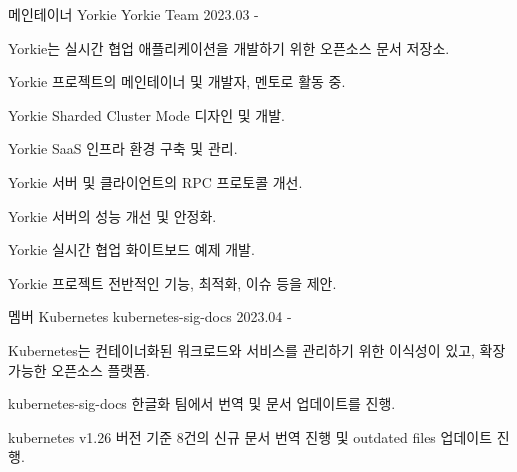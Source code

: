 

\begin{cventries}

  \cventry
    {메인테이너} %
    {Yorkie} %
    {Yorkie Team} %
    {2023.03 - } %
    {
      \begin{cvitems} %
        \item {Yorkie는 실시간 협업 애플리케이션을 개발하기 위한 오픈소스 문서 저장소.}
        \item {Yorkie 프로젝트의 메인테이너 및 개발자, 멘토로 활동 중.}
        \item {Yorkie Sharded Cluster Mode 디자인 및 개발.}
        \item {Yorkie SaaS 인프라 환경 구축 및 관리.}
        \item {Yorkie 서버 및 클라이언트의 RPC 프로토콜 개선.}
        \item {Yorkie 서버의 성능 개선 및 안정화.}
        \item {Yorkie 실시간 협업 화이트보드 예제 개발.}
        \item {Yorkie 프로젝트 전반적인 기능, 최적화, 이슈 등을 제안.}
      \end{cvitems}
    }

  \cventry
  {멤버} %
  {Kubernetes} %
  {kubernetes-sig-docs} %
  {2023.04 - } %
  {
    \begin{cvitems} %
      \item {Kubernetes는 컨테이너화된 워크로드와 서비스를 관리하기 위한 이식성이 있고, 확장 가능한 오픈소스 플랫폼.}
      \item {kubernetes-sig-docs 한글화 팀에서 번역 및 문서 업데이트를 진행.}
      \item {kubernetes v1.26 버전 기준 8건의 신규 문서 번역 진행 및 outdated files 업데이트 진행.}
    \end{cvitems}
  }


\end{cventries}

